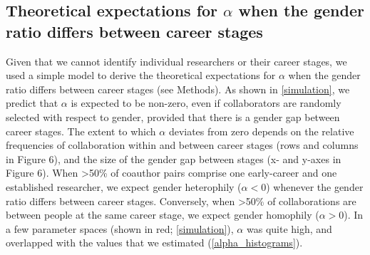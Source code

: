 \documentclass[12pt,]{article}
\begin{document}
\subsection{\texorpdfstring{Theoretical expectations for \(\alpha\) when
the gender ratio differs between career
stages}{Theoretical expectations for \textbackslash{}alpha when the gender ratio differs between career stages}}\label{theoretical-expectations-for-alpha-when-the-gender-ratio-differs-between-career-stages}

Given that we cannot identify individual researchers or their career
stages, we used a simple model to derive the theoretical expectations
for \(\alpha\) when the gender ratio differs between career stages (see
Methods). As shown in \autoref{simulation}, we predict that \(\alpha\)
is expected to be non-zero, even if collaborators are randomly selected
with respect to gender, provided that there is a gender gap between
career stages. The extent to which \(\alpha\) deviates from zero depends
on the relative frequencies of collaboration within and between career
stages (rows and columns in Figure 6), and the size of the gender gap
between stages (x- and y-axes in Figure 6). When \textgreater{}50\% of
coauthor pairs comprise one early-career and one established researcher,
we expect gender heterophily (\(\alpha < 0\)) whenever the gender ratio
differs between career stages. Conversely, when \textgreater{}50\% of
collaborations are between people at the same career stage, we expect
gender homophily (\(\alpha > 0\)). In a few parameter spaces (shown in
red; \autoref{simulation}), \(\alpha\) was quite high, and overlapped
with the values that we estimated (\autoref{alpha_histograms}).
\end{document}
